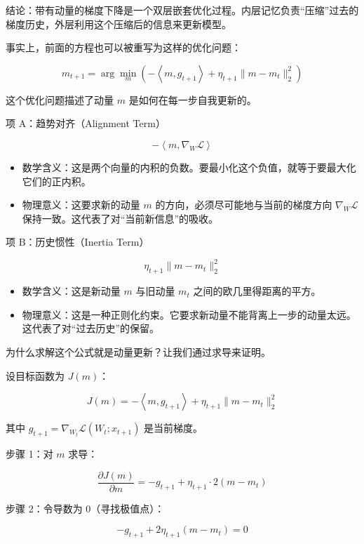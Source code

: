 结论：带有动量的梯度下降是一个双层嵌套优化过程。内层记忆负责``压缩''过去的梯度历史，外层利用这个压缩后的信息来更新模型。

事实上，前面的方程也可以被重写为这样的优化问题：

\[
m_{t+1}=\arg\min_m\left(
-\left\langle m,g_{t+1}\right\rangle
+\eta_{t+1}\lVert m-m_t\rVert_2^2
\right)
\tag{10}
\]

这个优化问题描述了动量 \(m\) 是如何在每一步自我更新的。

项 A：趋势对齐（Alignment Term）

\[
-\left\langle m,\nabla_W\mathcal{L}\right\rangle
\]

\begin{itemize}
\tightlist
\item
  数学含义：这是两个向量的内积的负数。要最小化这个负值，就等于要最大化它们的正内积。
\item
  物理意义：这要求新的动量 \(m\) 的方向，必须尽可能地与当前的梯度方向 \(\nabla_W\mathcal{L}\) 保持一致。这代表了对``当前新信息''的吸收。
\end{itemize}

项 B：历史惯性（Inertia Term）

\[
\eta_{t+1}\lVert m-m_t\rVert_2^2
\]

\begin{itemize}
\tightlist
\item
  数学含义：这是新动量 \(m\) 与旧动量 \(m_t\) 之间的欧几里得距离的平方。
\item
  物理意义：这是一种正则化约束。它要求新动量不能背离上一步的动量太远。这代表了对``过去历史''的保留。
\end{itemize}

为什么求解这个公式就是动量更新？让我们通过求导来证明。

设目标函数为 \(J(m)\)：

\[
J(m)=-\left\langle m,g_{t+1}\right\rangle+\eta_{t+1}\lVert m-m_t\rVert_2^2
\]

其中 \(g_{t+1}=\nabla_{W_t}\mathcal{L}(W_t;x_{t+1})\) 是当前梯度。

步骤 1：对 \(m\) 求导：

\[
\frac{\partial J(m)}{\partial m}=-g_{t+1}+\eta_{t+1}\cdot 2(m-m_t)
\]

步骤 2：令导数为 0（寻找极值点）：

\[
- g_{t+1}+2\eta_{t+1}(m-m_t)=0
\]


